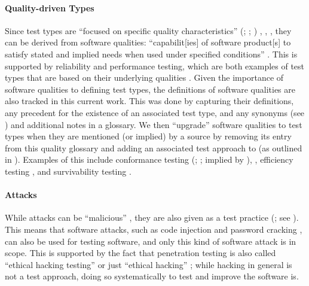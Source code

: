 \paragraph{Quality-driven Types}\label{qual-test}

Since test types are ``focused on specific quality characteristics''
\ifnotpaper
    (\citealp[p.~15]{IEEE2022}; \citeyear[p.~7]{IEEE2021};
    \citeyear[p.~473]{IEEE2017})%
\else
    \cite[p.~15]{IEEE2022}, \cite[p.~7]{IEEE2021}, \cite[p.~473]{IEEE2017}%
\fi, they can be derived from software qualities: ``capabilit[ies] of
software product[s] to satisfy stated and implied needs when used under
specified conditions'' \citep[p.~424]{IEEE2017}. This
is supported by reliability and performance testing, which are both examples of
test types \citep{IEEE2022, IEEE2021} that are based on their underlying
qualities \citep[p.~18]{FentonAndPfleeger1997}.
%
Given the importance of software qualities to defining test types, the
definitions of \qualityCount{} software qualities are also tracked in this
current work. This was done by capturing their
definitions, any precedent for the existence of an associated test type,
and any synonyms (see ) and additional notes in a glossary.
We then ``upgrade'' software qualities to test types when they are mentioned
(or implied) by a source by removing its entry from this quality glossary
and adding an associated test approach to \ourApproachGlossary{} (as outlined
in ). Examples of this include conformance testing \ifnotpaper
    (\citealp[p.~5\=/7]{SWEBOK2024}; \citealp[p.~25]{JardEtAl1999}; implied
    by \citealp[p.~93]{IEEE2017})\else \cite[p.~5\=/7]{SWEBOK2024},
    \cite[p.~25]{JardEtAl1999}\fi, efficiency testing
\citep[p.~44]{Kam2008}, and survivability testing \citep[p.~40]{GhoshAndVoas1999}.

\paragraph{Attacks}\label{attacks}
While attacks can be ``malicious'' \citep[p.~7]{IEEE2017}, they are also
given as a test practice (\citeyear[p.~34]{IEEE2022}; see ).
This means that software attacks, such as code injection and password
cracking \citepISTQB{}, can also be used for testing software, and only
this kind of software attack is in scope. This is supported by the fact
that penetration testing is also called ``ethical hacking testing''
\citep[p.~13-4]{SWEBOK2024} or just ``ethical hacking''
\citep[p.~28]{Gerrard2000b}; while hacking in general is not a test
approach, doing so systematically to test and improve the software is.

